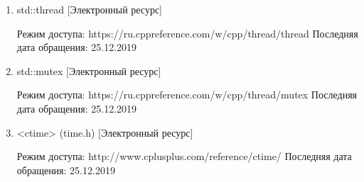 \documentclass[12pt]{report}
\begin{document}
\begin{enumerate}
		\item std::thread
		[Электронный ресурс] 
		
		Режим доступа: https://ru.cppreference.com/w/cpp/thread/thread Последняя дата обращения: 25.12.2019
				
		\item std::mutex
		[Электронный ресурс] 
		
		Режим доступа: https://ru.cppreference.com/w/cpp/thread/mutex Последняя дата обращения: 25.12.2019
				
		\item <ctime> (time.h)
		[Электронный ресурс] 
		
		Режим доступа: http://www.cplusplus.com/reference/ctime/ Последняя дата обращения: 25.12.2019
	\end{enumerate}
		
\end{document}
